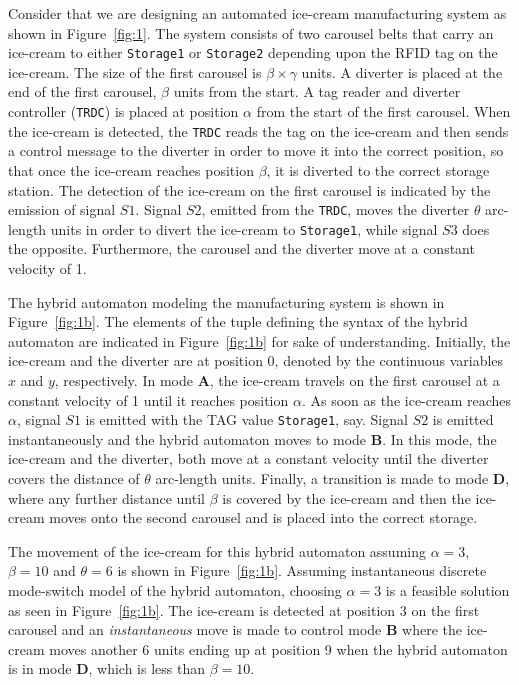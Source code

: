 \documentclass[10pt,journal,cspaper,compsoc]{IEEEtran}
\begin{document}
Consider that we are designing an automated ice-cream manufacturing
system as shown in Figure~\ref{fig:1}. The system consists of two
carousel belts that carry an ice-cream to either \texttt{Storage1} or
\texttt{Storage2} depending upon the RFID tag on the ice-cream. The size
of the first carousel is $\beta \times \gamma$ units. A diverter is
placed at the end of the first carousel, $\beta$ units from the start. A
tag reader and diverter controller (\texttt{TRDC}) is placed at position
$\alpha$ from the start of the first carousel. When the ice-cream is
detected, the \texttt{TRDC} reads the tag on the ice-cream and then
sends a control message to the diverter in order to move it into the
correct position, so that once the ice-cream reaches position $\beta$,
it is diverted to the correct storage station. The detection of the
ice-cream on the first carousel is indicated by the emission of signal
$S1$. Signal $S2$, emitted from the \texttt{TRDC}, moves the diverter
$\theta$ arc-length units in order to divert the ice-cream to
\texttt{Storage1}, while signal $S3$ does the opposite. Furthermore, the
carousel and the diverter move at a constant velocity of 1.

The hybrid automaton modeling the manufacturing system is shown in
Figure~\ref{fig:1b}. The elements of the tuple defining the syntax of
the hybrid automaton are indicated in Figure~\ref{fig:1b} for sake of
understanding. Initially, the ice-cream and the diverter are at position
0, denoted by the continuous variables $x$ and $y$, respectively. In
mode \textbf{A}, the ice-cream travels on the first carousel at a
constant velocity of 1 until it reaches position $\alpha$. As soon as
the ice-cream reaches $\alpha$, signal $S1$ is emitted with the TAG
value \texttt{Storage1}, say. Signal $S2$ is emitted instantaneously and
the hybrid automaton moves to mode \textbf{B}. In this mode, the
ice-cream and the diverter, both move at a constant velocity until the
diverter covers the distance of $\theta$ arc-length units. Finally, a
transition is made to mode \textbf{D}, where any further distance until
$\beta$ is covered by the ice-cream and then the ice-cream moves onto
the second carousel and is placed into the correct storage.

The movement of the ice-cream for this hybrid automaton assuming
$\alpha=3$, $\beta=10$ and $\theta=6$ is shown in
Figure~\ref{fig:1b}. Assuming instantaneous discrete mode-switch model
of the hybrid automaton, choosing $\alpha=3$ is a feasible solution as
seen in Figure~\ref{fig:1b}. The ice-cream is detected at position 3 on
the first carousel and an \textit{instantaneous} move is made to control
mode \textbf{B} where the ice-cream moves another 6 units ending up at
position 9 when the hybrid automaton is in mode \textbf{D}, which is
less than $\beta = 10$.
\end{document}
